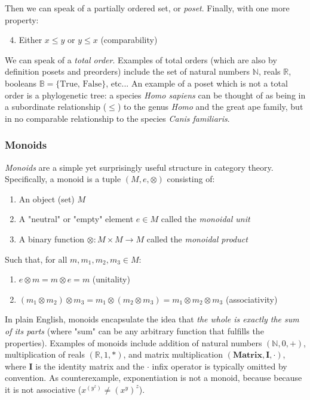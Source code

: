 \documentclass[12pt,a4paper]{article}
\begin{document}
Then we can speak of a partially ordered set, or \textit{poset}. Finally, with one more property:

\begin{enumerate}
\setcounter{enumi}{3}
\item Either $x \leq y$ or $y \leq x$ (comparability)
\end{enumerate}

We can speak of a \textit{total order}. Examples of total orders (which are also by definition posets and preorders) include the set of natural numbers $\mathbb{N}$, reals $\mathbb{R}$, booleans $\mathbb{B} = \{ \text{True, False} \}$, etc... An example of a poset which is not a total order is a phylogenetic tree: a species \textit{Homo sapiens} can be thought of as being in a subordinate relationship ($\leq$) to the genus \textit{Homo} and the great ape family, but in no comparable relationship to the species \textit{Canis familiaris}.

\subsubsection{Monoids}

\textit{Monoids} are a simple yet surprisingly useful structure in category theory. Specifically, a monoid is a tuple $(M, e, \otimes)$ consisting of:

\begin{enumerate}
\item An object (set) $M$
\item A "neutral" or "empty" element $e \in M$ called the \textit{monoidal unit}
\item A binary function $\otimes: M \times M \to M$ called the \textit{monoidal product}
\end{enumerate}

Such that, for all $m, m_1, m_2, m_3 \in M$: 

\begin{enumerate}
\renewcommand{\theenumi}{\alph{enumi}}
\item $e \otimes m = m \otimes e = m$ (unitality)
\item $(m_1 \otimes m_2) \otimes m_3 = m_1 \otimes (m_2 \otimes m_3) = m_1 \otimes m_2 \otimes m_3$ (associativity)
\end{enumerate}

In plain English, monoids encapsulate the idea that \textit{the whole is exactly the sum of its parts} (where "sum" can be any arbitrary function that fulfills the properties). Examples of monoids include addition of natural numbers $(\mathbb{N}, 0, +)$, multiplication of reals $(\mathbb{R}, 1, *)$, and matrix multiplication $(\mathbf{Matrix}, \mathbf{I}, \cdot)$, where $\mathbf{I}$ is the identity matrix and the $\cdot$ infix operator is typically omitted by convention. As counterexample, exponentiation is not a monoid, because because it is not associative ($x^{(y^z)} \neq (x^y)^z$). 
\end{document}
